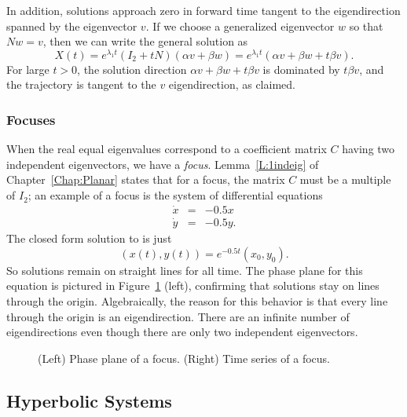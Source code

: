 \documentclass{ximera}
\begin{document}
In addition, solutions approach zero in forward time tangent to
the eigendirection spanned by the eigenvector $v$.  If we choose
a generalized eigenvector $w$ so that $Nw=v$, then we can write the
general solution as
\[
X(t) =  e^{\lambda_1 t}(I_2 + tN)(\alpha v+\beta w) =
e^{\lambda_1 t}\left(\alpha v + \beta w +  t\beta v \right).
\]
For large $t>0$, the solution direction $\alpha v + \beta w + t\beta v$ is
dominated by $t\beta v$, and the trajectory is tangent to the $v$
eigendirection, as claimed.


\subsubsection*{Focuses}

When the real equal eigenvalues correspond to a coefficient matrix $C$
having two independent eigenvectors, we have a {\em focus\/}.
Lemma~\ref{L:1indeig} of Chapter~\ref{Chap:Planar} states that for a focus,
the matrix $C$ must be a multiple of $I_2$; an example of a focus is the
system of differential equations
\begin{equation}  \label{e:focuseqn}
\begin{array}{rcl}
\dot{x} & = & -0.5x \\
\dot{y} & = & -0.5y.
\end{array}
\end{equation}
The closed form solution to  is just
\[
(x(t),y(t)) = e^{-0.5t}(x_0,y_0).
\]
So solutions remain on straight lines for all time.  The phase
plane for this equation is
pictured in Figure~\ref{F:degennodes}
(left), confirming that solutions stay on lines through the
origin.  Algebraically, the reason for this behavior is that every
line through the origin is an eigendirection.  There are an infinite number
of eigendirections even though there are only two independent eigenvectors.

\begin{figure}[htb]
           \centerline{%
           }
           \caption{(Left) Phase plane of a focus.
	(Right) Time series of a focus.}
           \label{F:degennodes}
\end{figure}

\subsection*{Hyperbolic Systems}
\end{document}
